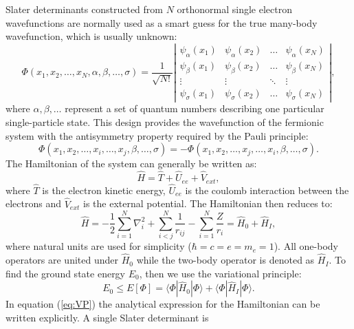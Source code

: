 \documentclass[twoside,english]{uiofysmaster}
\begin{document}
Slater determinants constructed from $N$ orthonormal single electron
wavefunctions are normally used as a smart guess for the true many-body
wavefunction, which is usually unknown:
\begin{equation}\label{eq:HartreeFockDet}
\Phi(x_1, x_2,\dots ,x_N,\alpha,\beta,\dots, \sigma)=\frac{1}{\sqrt{N!}}
\left| \begin{array}{ccccc} \psi_{\alpha}(x_1)& \psi_{\alpha}(x_2)& \dots & \psi_{\alpha}(x_N)\\
\psi_{\beta}(x_1)&\psi_{\beta}(x_2)& \dots  & \psi_{\beta}(x_N)\\  
\vdots & \vdots & \ddots  & \vdots \\
\psi_{\sigma}(x_1)&\psi_{\sigma}(x_2)& \dots  & \psi_{\sigma}(x_N)\end{array} \right|, 
\end{equation}
where $\alpha, \beta, \dots $ represent a set of quantum numbers describing one particular single-particle state. This design provides the wavefunction of the fermionic system with the antisymmetry property required by the Pauli principle:
\begin{equation}
\Phi(x_1, x_2,\dots ,x_i,\dots, x_j, \beta,\dots, \sigma) = -\Phi(x_1, x_2,\dots ,x_j,\dots, x_i, \beta,\dots, \sigma).
\end{equation}
The Hamiltonian of the system can generally be written as:
\begin{equation}\label{HAM}
\hat{H} = \hat{T} + \hat{U}_{ee} + \hat{V}_{ext},
\end{equation}
where $\hat{T}$ is the electron kinetic energy, $\hat{U}_{ee}$ is the coulomb interaction between the electrons and $\hat{V}_{ext}$ is the external potential. %
The Hamiltonian then reduces to:
\[
\hat{H} = -\frac{1}{2}\sum_{i=1}^{N} \nabla_i^2 + \sum_{i<j}^{N}\frac{1}{r_{ij}} - \sum_{i=1}^{N} \frac{Z}{r_i} = \hat{H}_0 + \hat{H}_I,
\]
where natural units are used for simplicity ($\hbar=c=e=m_e=1$). All one-body operators are united under $\hat{H}_0$ while the two-body operator is denoted as $\hat{H}_I$.
To find the ground state energy $E_0$, then we use the variational principle\cite{SzaboModernQuantumChemistry1996}:
\begin{equation}\label{eq:VP}
E_0 \le E[\Phi] = \langle \Phi|\hat{H}_0|\Phi\rangle + \langle \Phi|\hat{H}_I|\Phi\rangle.
\end{equation}
In equation (\ref{eq:VP}) the analytical expression for the
Hamiltonian can be written explicitly. A single Slater determinant is
\end{document}
